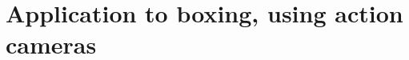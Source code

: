 
\lhead[\fancyplain{}{\leftmark}]%
      {\fancyplain{}{}} %
\chead[\fancyplain{}{}]%
      {\fancyplain{}{}}
\rhead[\fancyplain{}{}]%
      {\fancyplain{}{\rightmark}}%
\lfoot[\fancyplain{}{}]%
      {\fancyplain{}{}}
\cfoot[\fancyplain{}{\thepage}]%
      {\fancyplain{}{\thepage}} %
\rfoot[\fancyplain{}{}]%
     {\fancyplain{}{\scriptsize}}



\chapter{Application to boxing, using action cameras}
\label{ch:6}





